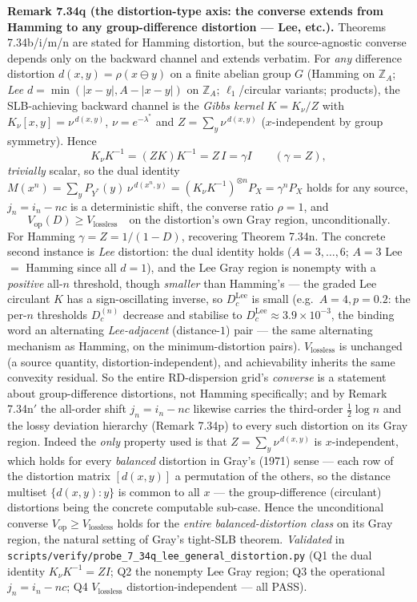 \documentclass[
]{article}
\begin{document}
\textbf{Remark 7.34q (the distortion-type axis: the converse extends from
Hamming to any group-difference distortion --- Lee, etc.).} Theorems
7.34b/i/m/n are stated for Hamming distortion, but the source-agnostic converse
depends only on the backward channel and extends verbatim. For \emph{any}
difference distortion $d(x,y)=\rho(x\ominus y)$ on a finite abelian group $G$
(Hamming on $\mathbb Z_A$; \emph{Lee} $d=\min(|x-y|,A-|x-y|)$ on $\mathbb Z_A$;
$\ell_1$/circular variants; products), the SLB-achieving backward channel is the
\emph{Gibbs kernel} $K=K_\nu/Z$ with $K_\nu[x,y]=\nu^{\,d(x,y)}$,
$\nu=e^{-\lambda^*}$ and $Z=\sum_y\nu^{\,d(x,y)}$ ($x$-independent by group
symmetry). Hence
\[
  K_\nu K^{-1}=(ZK)K^{-1}=Z\,I=\gamma I\qquad(\gamma=Z),
\]
\emph{trivially} scalar, so the dual identity $M(x^n)=\sum_y P_{Y^*}(y)\,
\nu^{\,d(x^n,y)}=(K_\nu K^{-1})^{\otimes n}P_X=\gamma^n P_X$ holds for any source,
$j_n=i_n-nc$ is a deterministic shift, the converse ratio $\rho=1$, and
\[
  V_{\mathrm{op}}(D)\ge V_{\mathrm{lossless}}\quad\text{on the distortion's own
  Gray region, unconditionally.}
\]
For Hamming $\gamma=Z=1/(1-D)$, recovering Theorem 7.34n. The concrete second
instance is \emph{Lee} distortion: the dual identity holds ($A=3,\dots,6$;
$A=3$ Lee $=$ Hamming since all $d=1$), and the Lee Gray region is nonempty with a \emph{positive} all-$n$ threshold,
though \emph{smaller} than Hamming's --- the graded Lee circulant $K$ has a
sign-oscillating inverse, so $D_c^{\mathrm{Lee}}$ is small (e.g.\ $A=4,p=0.2$: the
per-$n$ thresholds $D_c^{(n)}$ decrease and stabilise to $D_c^{\mathrm{Lee}}
\approx3.9\times10^{-3}$, the binding word an alternating \emph{Lee-adjacent}
(distance-$1$) pair --- the same alternating mechanism as Hamming, on the
minimum-distortion pairs). $V_{\mathrm{lossless}}$
is unchanged (a source quantity, distortion-independent), and achievability
inherits the same convexity residual. So the entire RD-dispersion grid's
\emph{converse} is a statement about group-difference distortions, not Hamming
specifically; and by Remark 7.34n$'$ the all-order shift $j_n=i_n-nc$ likewise
carries the third-order $\tfrac12\log n$ and the lossy deviation hierarchy
(Remark 7.34p) to every such distortion on its Gray region. Indeed the
\emph{only} property used is that $Z=\sum_y\nu^{\,d(x,y)}$ is $x$-independent,
which holds for every \emph{balanced} distortion in Gray's (1971) sense --- each
row of the distortion matrix $[d(x,y)]$ a permutation of the others, so the
distance multiset $\{d(x,y):y\}$ is common to all $x$ --- the group-difference
(circulant) distortions being the concrete computable sub-case. Hence the
unconditional converse $V_{\mathrm{op}}\ge V_{\mathrm{lossless}}$ holds for the
\emph{entire balanced-distortion class} on its Gray region, the natural setting
of Gray's tight-SLB theorem. \emph{Validated} in
\texttt{scripts/verify/probe\_7\_34q\_lee\_general\_distortion.py} (Q1 the dual
identity $K_\nu K^{-1}=ZI$; Q2 the nonempty Lee Gray region; Q3 the operational
$j_n=i_n-nc$; Q4 $V_{\mathrm{lossless}}$ distortion-independent --- all PASS).
\end{document}
